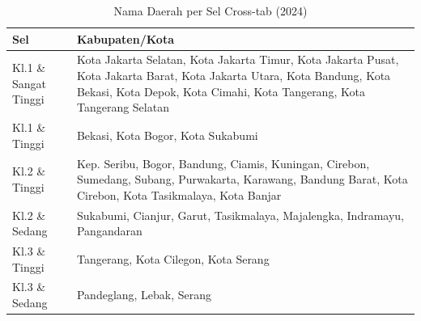 \begin{table}[H]
\centering
\small
\caption{Nama Daerah per Sel Cross-tab (2024)} \label{tab:crossname2024}
\begin{tabular}{|>{\raggedright\arraybackslash}m{}|>{\raggedright\arraybackslash}m{}|}
\hline
\textbf{Sel} & \textbf{Kabupaten/Kota} \\
\hline
Kl.1 \& Sangat Tinggi & Kota Jakarta Selatan, Kota Jakarta Timur, Kota Jakarta Pusat, Kota Jakarta Barat, Kota Jakarta Utara, Kota Bandung, Kota Bekasi, Kota Depok, Kota Cimahi, Kota Tangerang, Kota Tangerang Selatan \\
\hline
Kl.1 \& Tinggi & Bekasi, Kota Bogor, Kota Sukabumi \\
\hline
Kl.2 \& Tinggi & Kep. Seribu, Bogor, Bandung, Ciamis, Kuningan, Cirebon, Sumedang, Subang, Purwakarta, Karawang, Bandung Barat, Kota Cirebon, Kota Tasikmalaya, Kota Banjar \\
\hline
Kl.2 \& Sedang & Sukabumi, Cianjur, Garut, Tasikmalaya, Majalengka, Indramayu, Pangandaran \\
\hline
Kl.3 \& Tinggi & Tangerang, Kota Cilegon, Kota Serang \\
\hline
Kl.3 \& Sedang & Pandeglang, Lebak, Serang \\
\hline
\end{tabular}
\end{table}